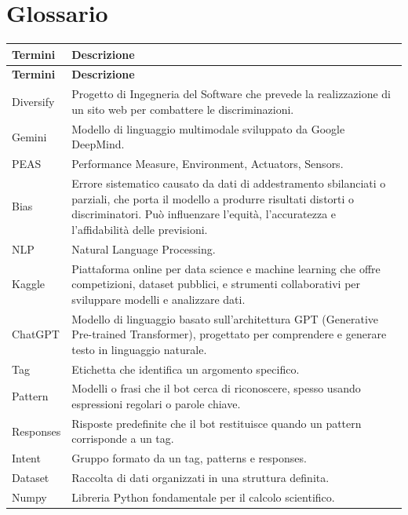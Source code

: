 \documentclass[12pt, letterpaper]{article}
\begin{document}
\section{Glossario}
\begin{longtable}{|l|p{10cm}|}
	\hline
	\textbf{Termini} & \textbf{Descrizione} \\
	\hline
	\endfirsthead
	\hline
	\textbf{Termini} & \textbf{Descrizione} \\
	\hline
	\endhead
	\hline
	\endfoot
	\hline
	\endlastfoot
	
	Diversify & Progetto di Ingegneria del Software che prevede la realizzazione di un sito web per combattere le discriminazioni. \\
	\hline
	Gemini & Modello di linguaggio multimodale sviluppato da Google DeepMind. \\
	\hline
	PEAS & Performance Measure, Environment, Actuators, Sensors. \\
	\hline
	Bias & Errore sistematico causato da dati di addestramento sbilanciati o parziali, che porta il modello a produrre risultati distorti o discriminatori. Può influenzare l'equità, l'accuratezza e l'affidabilità delle previsioni. \\
	\hline
	NLP & Natural Language Processing. \\
	\hline
	Kaggle & Piattaforma online per data science e machine learning che offre competizioni, dataset pubblici, e strumenti collaborativi per sviluppare modelli e analizzare dati. \\
	\hline
	ChatGPT & Modello di linguaggio basato sull'architettura GPT (Generative Pre-trained Transformer), progettato per comprendere e generare testo in linguaggio naturale. \\
	\hline
	Tag & Etichetta che identifica un argomento specifico. \\
	\hline
	Pattern & Modelli o frasi che il bot cerca di riconoscere, spesso usando espressioni regolari o parole chiave. \\
	\hline
	Responses & Risposte predefinite che il bot restituisce quando un pattern corrisponde a un tag. \\
	\hline
	Intent & Gruppo formato da un tag, patterns e responses. \\
	\hline
	Dataset & Raccolta di dati organizzati in una struttura definita. \\
	\hline
	Numpy & Libreria Python fondamentale per il calcolo scientifico. \\

\end{longtable}
\end{document}
